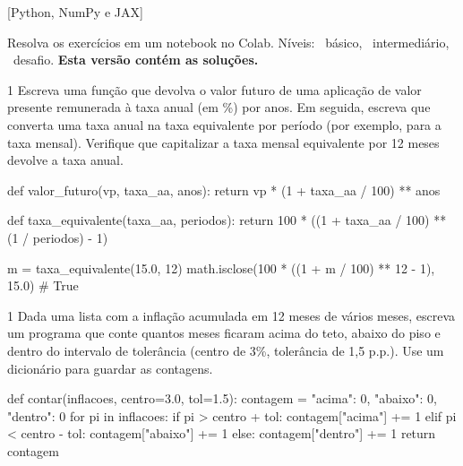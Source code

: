\documentclass[lista]{tmlnotas}
\begin{document}
[Python, NumPy e JAX]

\noindent Resolva os exercícios em um notebook no Colab. Níveis:
~básico, ~intermediário, ~desafio.
\ifsolucao\textbf{Esta versão contém as soluções.}\fi

\begin{exercicio}{1}
Escreva uma função  que devolva o valor
futuro de uma aplicação de valor presente  remunerada à taxa anual
 (em \%) por  anos. Em seguida, escreva
 que converta uma taxa anual na taxa
equivalente por período (por exemplo,  para a taxa mensal).
Verifique que capitalizar a taxa mensal equivalente por 12 meses devolve a
taxa anual.
\end{exercicio}
\begin{solucao}
\begin{codigo}
def valor_futuro(vp, taxa_aa, anos):
    return vp * (1 + taxa_aa / 100) ** anos

def taxa_equivalente(taxa_aa, periodos):
    return 100 * ((1 + taxa_aa / 100) ** (1 / periodos) - 1)

m = taxa_equivalente(15.0, 12)
math.isclose(100 * ((1 + m / 100) ** 12 - 1), 15.0)   # True
\end{codigo}
\end{solucao}

\begin{exercicio}{1}
Dada uma lista com a inflação acumulada em 12 meses de vários meses, escreva
um programa que conte quantos meses ficaram acima do teto, abaixo do piso e
dentro do intervalo de tolerância (centro de 3\%, tolerância de 1,5 p.p.).
Use um dicionário para guardar as contagens.
\end{exercicio}
\begin{solucao}
\begin{codigo}
def contar(inflacoes, centro=3.0, tol=1.5):
    contagem = {"acima": 0, "abaixo": 0, "dentro": 0}
    for pi in inflacoes:
        if pi > centro + tol:
            contagem["acima"] += 1
        elif pi < centro - tol:
            contagem["abaixo"] += 1
        else:
            contagem["dentro"] += 1
    return contagem
\end{codigo}
\end{solucao}
\end{document}
